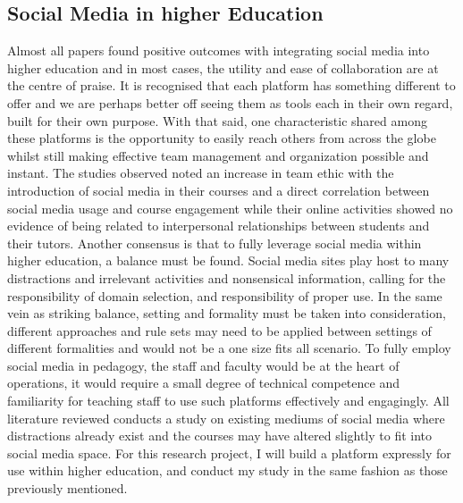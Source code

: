 \documentclass[lettersize,journal]{IEEEtran}
\begin{document}
        \subsection{Social Media in higher Education}
        Almost all papers found positive outcomes with integrating social media into higher education and in most cases, the utility and ease
        of collaboration are at the centre of praise. It is recognised that each platform has something different to offer and we are perhaps
        better off seeing them as tools each in their own regard, built for their own purpose. With that said, one characteristic shared among these platforms
         is the opportunity to easily reach others from across the globe whilst still making effective team management and organization possible and instant.
         The studies observed noted an increase in team ethic with the introduction of social media in their courses and a direct correlation between
         social media usage and course engagement while their online activities showed no evidence of being related to interpersonal relationships
         between students and their tutors. Another consensus is that to fully leverage social media within higher education, a balance must be found.
         Social media sites play host to many distractions and irrelevant activities and nonsensical information, calling for the responsibility of domain
         selection, and responsibility of proper use. In the same vein as striking balance, setting and formality must be taken into consideration, different
         approaches and rule sets may need to be applied between settings of different formalities and would not be a one size fits all scenario. To fully
         employ social media in pedagogy, the staff and faculty would be at the heart of operations, it would require a small degree of technical competence and
         familiarity for teaching staff to use such platforms effectively and engagingly.
         All literature reviewed conducts a study on existing mediums of social media where distractions already exist and the courses may have altered slightly  to
         fit into social media space. For this research project, I will build a platform expressly for use within higher education,
         and conduct my study in the same fashion as those previously mentioned.
\end{document}
